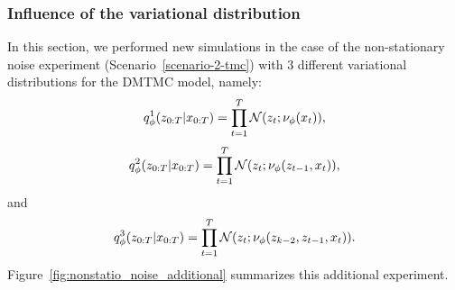 \subsubsection{Influence of the variational distribution}
\label{app:var_distrib}
In this section, we performed new simulations in the case of the non-stationary noise experiment (Scenario~\eqref{scenario-2-tmc}) with $3$ different variational distributions for the DMTMC model, namely:
    \begin{equation*}
    q_{\phi}^1(z_{0:T}|x_{0:T})=\prod_{t=1}^T
    \mathcal{N}(z_t;\nu_{\phi}(x_t)),    
    \end{equation*}
    \begin{equation*}
        q_{\phi}^2(z_{0:T}|x_{0:T})=\prod_{t=1}^T
    \mathcal{N}(z_t;\nu_{\phi}(z_{t-1},x_t)), 
    \end{equation*}
    and
    \begin{equation*}
        q_{\phi}^3(z_{0:T}|x_{0:T})=\prod_{t=1}^T
    \mathcal{N}(z_t;\nu_{\phi}(z_{k-2}, z_{t-1},x_t)).
    \end{equation*}
Figure~\ref{fig:nonstatio_noise_additional} summarizes this additional experiment.

